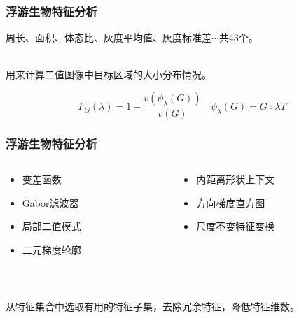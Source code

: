 \documentclass[notheorems,mathserif,table,compress]{beamer}  %
\begin{document}

\begin{frame}
\frametitle{浮游生物特征分析}

{}

周长、面积、体态比、灰度平均值、灰度标准差$\cdots$共43个。\\
~

{}

用来计算二值图像中目标区域的大小分布情况。

\begin{displaymath}
F_{G}(\lambda) = 1-\frac{v(\psi_{\lambda}(G))}{v(G)} ~~~~ \psi_{\lambda}(G) = G\circ\lambda T
\end{displaymath}
\end{frame}

\begin{frame}
\frametitle{浮游生物特征分析}
\begin{columns}
\begin{column}{0.5\linewidth}
{}
\begin{itemize}
\item 变差函数
\item Gabor滤波器
\item 局部二值模式
\item 二元梯度轮廓
\end{itemize}
\end{column}
\begin{column}{0.5\linewidth}
{}
\begin{itemize}
\item 内距离形状上下文
\item 方向梯度直方图
\item 尺度不变特征变换
\end{itemize}
\end{column}
\end{columns}\vspace{1ex}

~\\
\pause


从特征集合中选取有用的特征子集，去除冗余特征，降低特征维数。
\end{frame}
\end{document}
